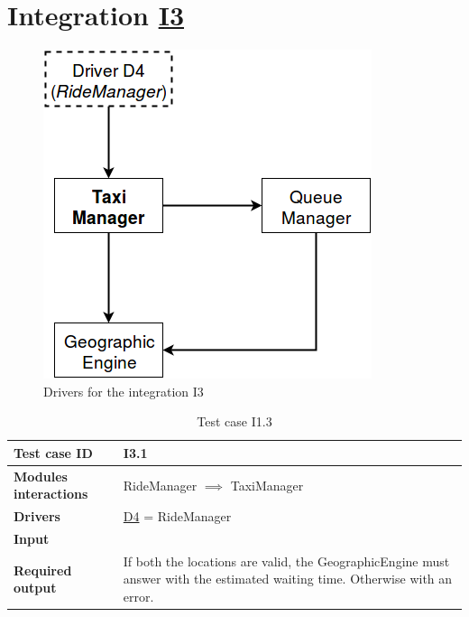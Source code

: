 \section{Integration \hyperref[I3]{I3} \label{int_I3}}
\begin{figure}[H]
\centering
\includegraphics[scale = 0.5]{"../Analysis Documents/I3"}
\caption{Drivers for the integration I3}
\end{figure}


\begin{table}[H]
\begin{tabular}{ l | p{} }
\textbf{Test case ID} & I3.1 \\ \hline
\textbf{Modules interactions} & RideManager $\implies$ TaxiManager \\ \hline
\textbf{Drivers} &  \hyperref[D4]{D4} = RideManager \\ \hline
\textbf{Input} &  \\ \hline
\textbf{Required output} & If both the locations are valid, the GeographicEngine must answer with the estimated waiting time. Otherwise with an error.
\end{tabular}
\caption{Test case I1.3}
\end{table}